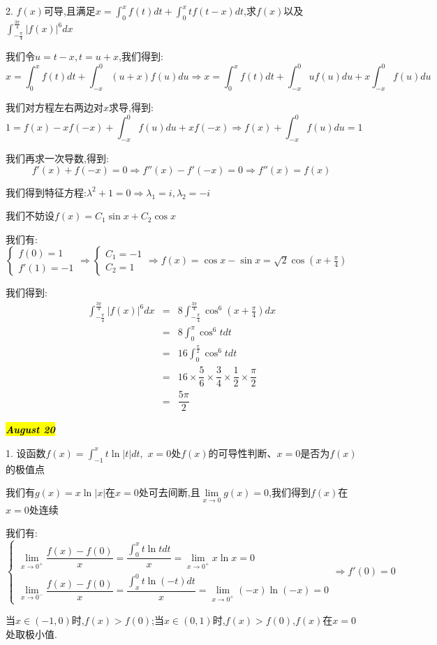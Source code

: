 2. $f(x)$可导,且满足$x=\int_{0}^{x}f(t)dt+\int_{0}^{x}tf(t-x)dt$,求$f(x)$以及$\int_{-\frac{\pi}{4}}^{\frac{3\pi}{4}}|f(x)|^6dx$
\begin{solution}

	我们令$u=t-x,t=u+x$,我们得到:
	$$x=\int_{0}^{x}f(t)dt+\int_{-x}^{0}(u+x)f(u)du\Rightarrow x=\int_{0}^{x}f(t)dt+\int_{-x}^{0}uf(u)du+x\int_{-x}^{0}f(u)du$$
	
	我们对方程左右两边对$x$求导,得到:
	$$1=f(x)-xf(-x)+\int_{-x}^{0}f(u)du+xf(-x)\Rightarrow f(x)+\int_{-x}^{0}f(u)du=1$$
	
	我们再求一次导数,得到:  
	$$f'(x)+f(-x)=0\Rightarrow f''(x)-f'(-x)=0\Rightarrow f''(x)=f(x)$$
	
	我们得到特征方程:$\lambda^2+1=0\Rightarrow \lambda_{1}=i,\lambda_{2}=-i$
	
	我们不妨设$f(x)=C_{1}\sin x+C_{2}\cos x$
	
	我们有:$\left\lbrace
	\begin{array}{l}
		f(0)=1\\
		f'(1)=-1
	\end{array}
	\right. \Rightarrow \left\lbrace
	\begin{array}{l}
		C_{1}=-1\\
		C_{2}=1
	\end{array}
	\right. \Rightarrow f(x)=\cos x-\sin x=\sqrt{2}\cos(x+\frac{\pi}{4})$
	
	我们得到:
	\begin{eqnarray*}
		\int_{-\frac{\pi}{4}}^{\frac{3\pi}{4}}|f(x)|^6dx&=&8\int_{-\frac{\pi}{4}}^{\frac{3\pi}{4}}\cos^6(x+\frac{\pi}{4})dx\\
		&=&8\int_{0}^{\pi}\cos^6 tdt\\
		&=&16\int_{0}^{\frac{\pi}{2}}\cos^6 tdt\\
		&=&16\times\dfrac{5}{6}\times\dfrac{3}{4}\times\dfrac{1}{2}\times\dfrac{\pi}{2}\\
		&=&\dfrac{5\pi}{2}
	\end{eqnarray*}
\end{solution}

\hl{\textbf{\textit{August 20}}}

1. 设函数$f(x)=\int_{-1}^{x}t\ln|t|dt$,\ $x=0$处$f(x)$的可导性判断、$x=0$是否为$f(x)$的极值点
\begin{solution}

	我们有$g(x)=x\ln|x|$在$x=0$处可去间断,且$\lim\limits_{x\rightarrow 0}g(x)=0$,我们得到$f(x)$在$x=0$处连续
	
	我们有:
	$$\left\lbrace
	\begin{array}{l}
		\lim\limits_{x\rightarrow 0^{+}}\dfrac{f(x)-f(0)}{x}=\dfrac{\int_{0}^{x}t\ln tdt}{x}=\lim\limits_{x\rightarrow 0^{+}}x\ln x=0\\
		\lim\limits_{x\rightarrow 0^{-}}\dfrac{f(x)-f(0)}{x}=\dfrac{\int_{x}^{0}t\ln(-t)dt}{x}=\lim\limits_{x\rightarrow 0^{+}}(-x)\ln(-x)=0
	\end{array}
	\right. \Rightarrow f'(0)=0$$
	
	当$x\in(-1,0)$时,$f(x)>f(0)$;当$x\in(0,1)$时,$f(x)>f(0)$,$f(x)$在$x=0$处取极小值.
\end{solution}

